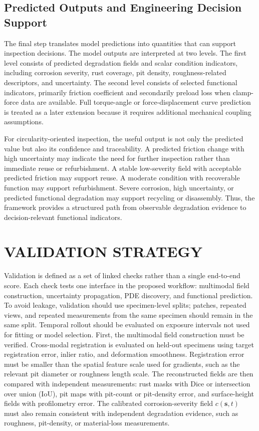 \documentclass[colorlinks,upint,subscriptcorrection,varvw,hyphenate,balance]{asmeconf}
\newcommand{\vect}[1]{\bm{#1}}
\begin{document}
\subsection{Predicted Outputs and Engineering Decision Support}
The final step translates model predictions into quantities that can support inspection decisions. The model outputs are interpreted at two levels. The first level consists of predicted degradation fields and scalar condition indicators, including corrosion severity, rust coverage, pit density, roughness-related descriptors, and uncertainty. The second level consists of selected functional indicators, primarily friction coefficient and secondarily preload loss when clamp-force data are available. Full torque-angle or force-displacement curve prediction is treated as a later extension because it requires additional mechanical coupling assumptions.

For circularity-oriented inspection, the useful output is not only the predicted value but also its confidence and traceability. A predicted friction change with high uncertainty may indicate the need for further inspection rather than immediate reuse or refurbishment. A stable low-severity field with acceptable predicted friction may support reuse. A moderate condition with recoverable function may support refurbishment. Severe corrosion, high uncertainty, or predicted functional degradation may support recycling or disassembly. Thus, the framework provides a structured path from observable degradation evidence to decision-relevant functional indicators.

\section{VALIDATION STRATEGY}
Validation is defined as a set of linked checks rather than a single
end-to-end score. Each check tests one interface in the proposed workflow:
multimodal field construction, uncertainty propagation, PDE discovery, and
functional prediction. To avoid leakage, validation should use specimen-level
splits; patches, repeated views, and repeated measurements from the same
specimen should remain in the same split. Temporal rollout should be evaluated
on exposure intervals not used for fitting or model selection.
First, the multimodal field construction must be verified. Cross-modal
registration is evaluated on held-out specimens using target registration
error, inlier ratio, and deformation smoothness. Registration error must be
smaller than the spatial feature scale used for gradients, such as the relevant
pit diameter or roughness length scale. The reconstructed fields are then
compared with independent measurements: rust masks with Dice or intersection
over union (IoU), pit maps
with pit-count or pit-density error, and surface-height fields with
profilometry error. The calibrated corrosion-severity field
$c(\vect{s},t)$ must also remain consistent with independent degradation
evidence, such as roughness, pit-density, or material-loss measurements.
\end{document}
